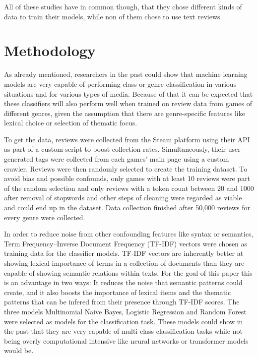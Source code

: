 \documentclass[11pt, a4paper]{article}
\begin{document}
All of these studies have in common though, that they chose different kinds of data to train their models, while non
of them chose to use text reviews.


\section{Methodology}\label{sec:methodology}
As already mentioned, researchers in the past could show that machine learning models are very capable of performing
class or genre classification in various situations and for various types of media.
Because of that it can be expected that these classifiers will also perform well when trained on review data from
games of different genres, given the assumption that there are genre-specific features like lexical choice or selection
of thematic focus.

To get the data, reviews were collected from the Steam platform using their API as part of a custom script to boost
collection rates.
Simultaneously, their user-generated tags were collected from each games' main page using a custom crawler.
Reviews were then randomly selected to create the training dataset.
To avoid bias and possible confounds, only games with at least 10 reviews were part of the random selection and only
reviews with a token count between 20 and 1000 after removal of stopwords and other steps of cleaning were regarded
as viable and could end up in the dataset.
Data collection finished after 50,000 reviews for every genre were collected.

In order to reduce noise from other confounding features like syntax or semantics, Term Frequency--Inverse Document
Frequency (TF-IDF) vectors were chosen as training data for the classifier models.
TF-IDF vectors are inherently better at showing lexical importance of terms in a collection of documents than they are
capable of showing semantic relations within texts.
For the goal of this paper this is an advantage in two ways:
It reduces the noise that semantic patterns could create, and it also boosts the importance of lexical items and the
thematic patterns that can be infered from their presence through TF-IDF scores.
The three models Multinomial Naive Bayes, Logistic Regression and Random Forest were selected as models for the
classification task.
These models could show in the past that they are very capable of multi class classification tasks while not being
overly computational intensive like neural networks or transformer models would be.
\end{document}
